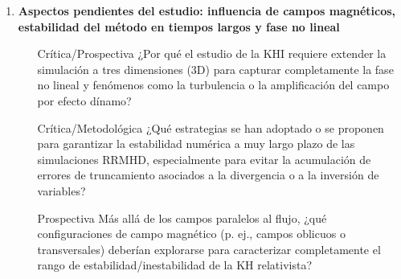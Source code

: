 \begin{enumerate}
    \item \textbf{Aspectos pendientes del estudio: influencia de campos magnéticos, estabilidad del método en tiempos largos y fase no lineal}
    \begin{itemize}
        \item [Crítica/Prospectiva] ¿Por qué el estudio de la KHI requiere extender la simulación a tres dimensiones (3D) para capturar completamente la fase no lineal y fenómenos como la turbulencia o la amplificación del campo por efecto dínamo? \cite{404}
        \item [Crítica/Metodológica] ¿Qué estrategias se han adoptado o se proponen para garantizar la estabilidad numérica a muy largo plazo de las simulaciones RRMHD, especialmente para evitar la acumulación de errores de truncamiento asociados a la divergencia o a la inversión de variables? \cite{370, 401}
        \item [Prospectiva] Más allá de los campos paralelos al flujo, ¿qué configuraciones de campo magnético (p. ej., campos oblicuos o transversales) deberían explorarse para caracterizar completamente el rango de estabilidad/inestabilidad de la KH relativista? \cite{429, 376}
    \end{itemize}

\end{enumerate}
